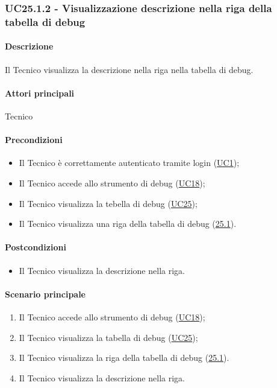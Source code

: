 
\subsubsection{UC25.1.2 - Visualizzazione descrizione nella riga della tabella di debug}\label{UC25point1point2}
\paragraph*{Descrizione}
Il Tecnico visualizza la descrizione nella riga nella tabella di debug.

\paragraph*{Attori principali}
Tecnico

\paragraph*{Precondizioni}
\begin{itemize}
  \item Il Tecnico è correttamente autenticato tramite login (\hyperref[UC1]{UC1});
  \item Il Tecnico accede allo strumento di debug (\hyperref[UC18]{UC18});
  \item Il Tecnico visualizza la tebella di debug (\hyperref[UC25]{UC25});
  \item Il Tecnico visualizza una riga della tabella di debug (\hyperref[25point1]{25.1}).
\end{itemize}

\paragraph*{Postcondizioni}
\begin{itemize}
  \item Il Tecnico visualizza la descrizione nella riga.
\end{itemize}

\paragraph*{Scenario principale}
\begin{enumerate}
  \item Il Tecnico accede allo strumento di debug (\hyperref[UC18]{UC18});
  \item Il Tecnico visualizza la tabella di debug (\hyperref[UC25]{UC25});
  \item Il Tecnico visualizza la riga della tabella di debug (\hyperref[UC25poin1]{25.1}).
  \item Il Tecnico visualizza la descrizione nella riga.
\end{enumerate}

